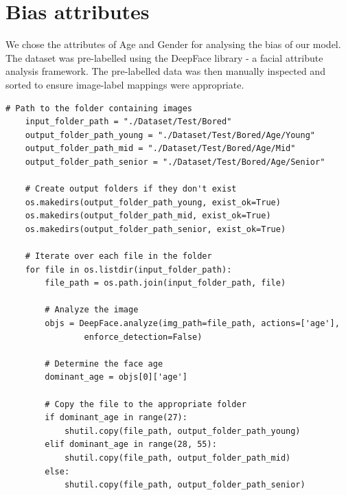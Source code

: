 \section{Bias attributes}
We chose the attributes of Age and Gender for analysing the bias of our model. The dataset was pre-labelled using the DeepFace \cite{deepface} library -  a facial attribute analysis framework. The pre-labelled data was then manually inspected and sorted to ensure image-label mappings were appropriate.
\vspace*{1em}
\begin{lstlisting}[caption={Pre-labelling the bias attributes}]
    # Path to the folder containing images
    input_folder_path = "./Dataset/Test/Bored"
    output_folder_path_young = "./Dataset/Test/Bored/Age/Young"
    output_folder_path_mid = "./Dataset/Test/Bored/Age/Mid"
    output_folder_path_senior = "./Dataset/Test/Bored/Age/Senior"

    # Create output folders if they don't exist
    os.makedirs(output_folder_path_young, exist_ok=True)
    os.makedirs(output_folder_path_mid, exist_ok=True)
    os.makedirs(output_folder_path_senior, exist_ok=True)

    # Iterate over each file in the folder
    for file in os.listdir(input_folder_path):
        file_path = os.path.join(input_folder_path, file)

        # Analyze the image
        objs = DeepFace.analyze(img_path=file_path, actions=['age'], 
                enforce_detection=False)

        # Determine the face age
        dominant_age = objs[0]['age']

        # Copy the file to the appropriate folder
        if dominant_age in range(27):
            shutil.copy(file_path, output_folder_path_young)
        elif dominant_age in range(28, 55):
            shutil.copy(file_path, output_folder_path_mid)
        else:
            shutil.copy(file_path, output_folder_path_senior)
    
\end{lstlisting}
